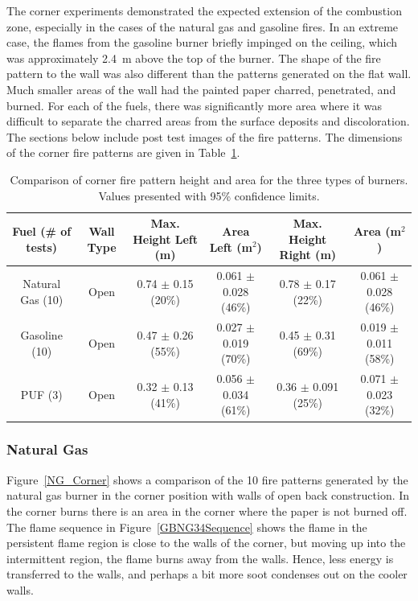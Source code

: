 \documentclass[twoside]{uocthesis}
\begin{document}
{The corner experiments demonstrated the expected extension of the combustion zone, especially in the cases of the natural gas and gasoline fires.  In an extreme case, the flames from the gasoline burner briefly impinged on the ceiling, which was approximately 2.4~m above the top of the burner. The shape of the fire pattern to the wall was also different than the patterns generated on the flat wall.  Much smaller areas of the wall had the painted paper charred, penetrated, and burned.  For each of the fuels, there was significantly more area where it was difficult to separate the charred areas from the surface deposits and discoloration. The sections below include post test images of the fire patterns.  The dimensions of the corner fire patterns are given in Table~\ref{tab:Fire_Pattern_Dimensions_Corners}.

\begin{table}
	\centering
	\footnotesize
	\begin{tabular}{|c|c|c|c|c|c|}
	\hline
	Fuel (\# of tests)      &   Wall Type   & Max. Height Left (m)	 	& Area Left (m$^2$)				&  Max. Height Right (m)        & Area (m$^2$)  				\\     \hline
		Natural Gas (10)    &   Open 		& 0.74 	$\pm$ 0.15 (20\%)  & 0.061 $\pm$ 0.028 (46\%) 	&  0.78 $\pm$ 0.17 (22\%) 	 	& 0.061 $\pm$ 0.028 (46\%)  	\\
		Gasoline (10)       &   Open    	& 0.47	$\pm$ 0.26 (55\%)  & 0.027 $\pm$ 0.019 (70\%) 	&  0.45 $\pm$ 0.31 (69\%)  	& 0.019 $\pm$ 0.011 (58\%)\\
		PUF (3)       		&   Open 		& 0.32	$\pm$ 0.13 (41\%)  & 0.056 $\pm$ 0.034 (61\%) 	&  0.36 $\pm$ 0.091 (25\%)  	& 0.071 $\pm$ 0.023 (32\%)\\
	\hline
	\end{tabular}
	\caption[Comparison of corner fire pattern height and area for the three types of burners]{Comparison of corner fire pattern height and area for the three types of burners. Values presented with 95\% confidence limits.}
	\label{tab:Fire_Pattern_Dimensions_Corners}
\end{table}

\subsubsection{Natural Gas}

Figure~\ref{NG_Corner} shows a comparison of the 10 fire patterns generated by the natural gas burner in the corner position with walls of open back construction. In the corner burns there is an area in the corner where the paper is not burned off.  The flame sequence in Figure~\ref{GBNG34Sequence} shows the flame in the persistent flame region is close to the walls of the corner, but moving up into the intermittent region, the flame burns away from the walls.  Hence, less energy is transferred to the walls, and perhaps a bit more soot condenses out on the cooler walls.    

}
\end{document}
